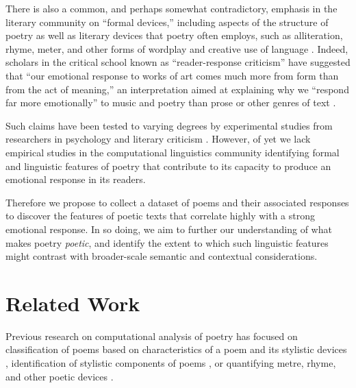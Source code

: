 \documentclass[11pt]{article}
\begin{document}
There is also a common, and perhaps somewhat contradictory, emphasis in the literary community on ``formal devices,'' including aspects of the structure of poetry as well as literary devices that poetry often employs, such as alliteration, rhyme, meter, and other forms of wordplay and creative use of language \cite{brooks1956well,packard1994poet,turco2000book}. Indeed, scholars in the critical school known as ``reader-response criticism'' have suggested that ``our emotional response to works of art comes much more from form than from the act of meaning,'' an interpretation aimed at explaining why we ``respond far more emotionally'' to music and poetry than prose or other genres of text \cite{holland1989dynamics}.

Such claims have been tested to varying degrees by experimental studies from researchers in psychology and literary criticism \cite{tsur1978emotions,miall2011emotions}.
However, of yet we lack empirical studies in the computational linguistics community identifying formal and linguistic features of poetry that contribute to its capacity to produce an emotional response in its readers.

Therefore we propose to collect a dataset of poems and their associated responses to discover the features of poetic texts that correlate highly with a strong emotional response. In so doing, we aim to further our understanding of what makes poetry \emph{poetic}, and identify the extent to which such linguistic features might contrast with broader-scale semantic and contextual considerations.



\section{Related Work}
Previous research on computational analysis of poetry has focused on classification of poems based on characteristics of a poem and its stylistic devices \cite{tizhoosh2008poetic,genzel2010poetic,kao2012computational}, identification of stylistic components of poems \cite{simonton1990lexical,brooke2012unsupervised}, or 
quantifying metre, rhyme, and other poetic devices \cite{greene2010automatic}.
\end{document}
